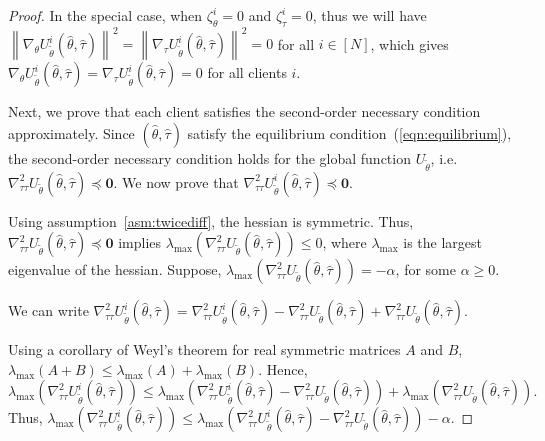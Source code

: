 \documentclass{article}
\let\cite\relax
\newcommand*{\cite}{\citep}
\theoremstyle{definition}
\begin{document}
\begin{proof}
In the special case, when $\zeta_{\theta}^i=0$ and $\zeta_{\tau}^i=0$, thus we will have $\left\|\nabla_{\theta}U_{\tilde\theta}^i(\hat\theta,\hat\tau)\right\|^2=\left\|\nabla_{\tau}U_{\tilde\theta}^i(\hat\theta,\hat\tau)\right\|^2=0$ for all $i\in [N]$, which gives $\nabla_{\theta}U_{\tilde\theta}^i(\hat\theta,\hat\tau)=\nabla_{\tau}U_{\tilde\theta}^i(\hat\theta,\hat\tau)=0$ for all clients $i$.

Next, we prove that each client satisfies the second-order necessary condition approximately.
Since $(\hat\theta,\hat\tau)$ satisfy the equilibrium condition~(\ref{eqn:equilibrium}), the second-order necessary condition holds for the global function $U_{\tilde\theta}$, i.e. $\nabla_{\tau\tau}^2U_{\tilde\theta}(\hat\theta,\hat\tau)\preceq \mathbf{0}.$ We now prove that $\nabla_{\tau\tau}^2U_{\tilde\theta}^i(\hat\theta,\hat\tau)\preceq \mathbf{0}.$

Using assumption~\ref{asm:twicediff}, the hessian is symmetric. Thus, $\nabla_{\tau\tau}^2U_{\tilde\theta}(\hat\theta,\hat\tau)\preceq \mathbf{0}$ implies $\lambda_{\max}(\nabla_{\tau\tau}^2U_{\tilde\theta}(\hat\theta,\hat\tau))\leq 0$, where $\lambda_{\max}$ is the largest eigenvalue of the hessian. Suppose,  $\lambda_{\max}(\nabla_{\tau\tau}^2U_{\tilde\theta}(\hat\theta,\hat\tau))=-\alpha$, for some $\alpha\geq 0$.

We can write $\nabla_{\tau\tau}^2U_{\tilde\theta}^i(\hat\theta,\hat\tau)=\nabla_{\tau\tau}^2U_{\tilde\theta}^i(\hat\theta,\hat\tau)-\nabla_{\tau\tau}^2U_{\tilde\theta}(\hat\theta,\hat\tau)+\nabla_{\tau\tau}^2U_{\tilde\theta}(\hat\theta,\hat\tau)$.

Using a corollary of Weyl's theorem \cite{Horn_Johnson_2012} for real symmetric matrices $A$ and $B$, $ \lambda_{\max}(A+B)\leq \lambda_{\max}(A)+\lambda_{\max}(B)$. Hence,
\begin{equation*}
  \lambda_{\max}(\nabla_{\tau\tau}^2U_{\tilde\theta}^i(\hat\theta,\hat\tau))\leq \lambda_{\max}(\nabla_{\tau\tau}^2U_{\tilde\theta}^i(\hat\theta,\hat\tau)-\nabla_{\tau\tau}^2U_{\tilde\theta}(\hat\theta,\hat\tau))+\lambda_{\max}(\nabla_{\tau\tau}^2U_{\tilde\theta}(\hat\theta,\hat\tau)).
\end{equation*}
Thus, $\lambda_{\max}(\nabla_{\tau\tau}^2U_{\tilde\theta}^i(\hat\theta,\hat\tau))\leq \lambda_{\max}(\nabla_{\tau\tau}^2U_{\tilde\theta}^i(\hat\theta,\hat\tau)-\nabla_{\tau\tau}^2U_{\tilde\theta}(\hat\theta,\hat\tau))-\alpha$.


\end{proof}
\end{document}
